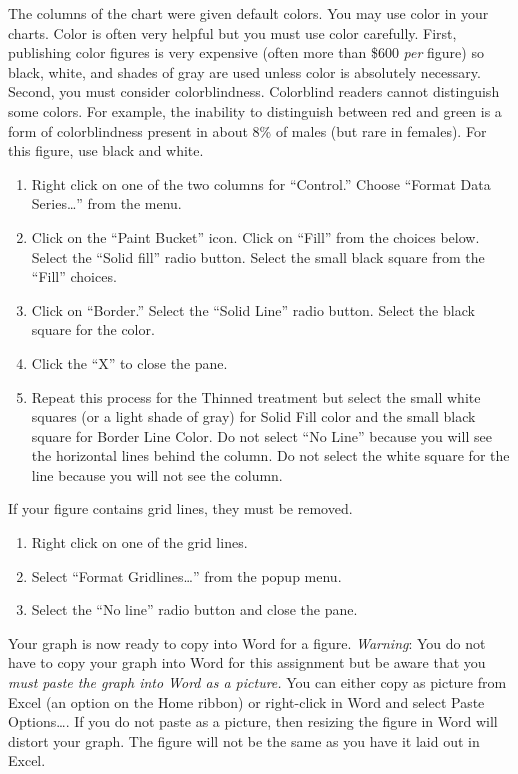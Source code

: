 \documentclass[11pt]{article}
\begin{document}
The columns of the chart were given default colors. You may use color in your charts. Color is often very helpful but you must use color carefully. First, publishing color figures is very expensive (often more than \$600 \emph{per} figure) so black, white, and shades of gray are used unless color is absolutely necessary. Second, you must consider colorblindness. Colorblind readers cannot distinguish some colors. For example, the inability to distinguish between red and green is a form of colorblindness present in about 8\% of males (but rare in females). For this figure, use black and white.

\begin{enumerate}[resume]
	\item Right click on one of the two columns for “Control.” Choose “Format Data Series…” from the menu.

	\item Click on the “Paint Bucket” icon. Click on “Fill” from the choices below. Select the “Solid fill” radio button. Select the small black square from the “Fill” choices.

	\item Click on “Border.” Select the “Solid Line” radio button. Select the black square for the color.

	\item Click the “X” to close the pane.

	\item Repeat this process for the Thinned treatment but select the small white squares (or a light shade of gray) for Solid Fill color  and the small black square for Border Line Color. Do not select “No Line” because you will see the horizontal lines behind the column. Do not select the white square for the line because you will not see the column.
\end{enumerate}

If your figure contains grid lines, they must be removed.

\begin{enumerate}[resume]
	\item Right click on one of the grid lines. 
	
	\item Select “Format Gridlines…” from the popup menu. 
	
	\item Select the “No line” radio button and close the pane.
\end{enumerate}

Your graph is now ready to copy into Word for a figure. \emph{Warning}: You do not have to copy your graph into Word for this assignment but be aware that you \emph{must paste the graph into Word as a picture.} You can either copy as picture from Excel (an option on the Home ribbon) or right-click in Word and select Paste Options…. If you do not paste as a picture, then resizing the figure in Word will distort your graph. The figure will not be the same as you have it laid out in Excel.
\end{document}
